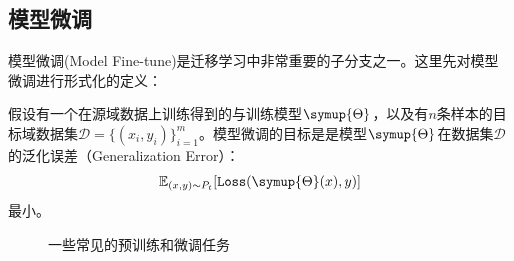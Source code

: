 \subsection{模型微调}

模型微调(Model Fine-tune)是迁移学习中非常重要的子分支之一。这里先对模型微调进行形式化的定义：

\begin{definition}[模型微调]
    假设有一个在源域数据上训练得到的与训练模型$\symup{\Theta}$，以及有$n$条样本的目标域数据集$\mathcal{D}={\{(x_i,y_i)\}_{i=1}^m}$。模型微调的目标是是模型$\symup{\Theta}$在数据集$\mathcal{D}$
    的泛化误差（Generalization Error）：
    \begin{equation}
        \mathbb{E}_{(x,y)\sim P_t}[\texttt{Loss}(\symup{\Theta}(x),y)]
    \end{equation}
    最小。
\end{definition}

\begin{figure}
    \centering
    \caption{一些常见的预训练和微调任务}
    \label{fig:finetune}
\end{figure}

